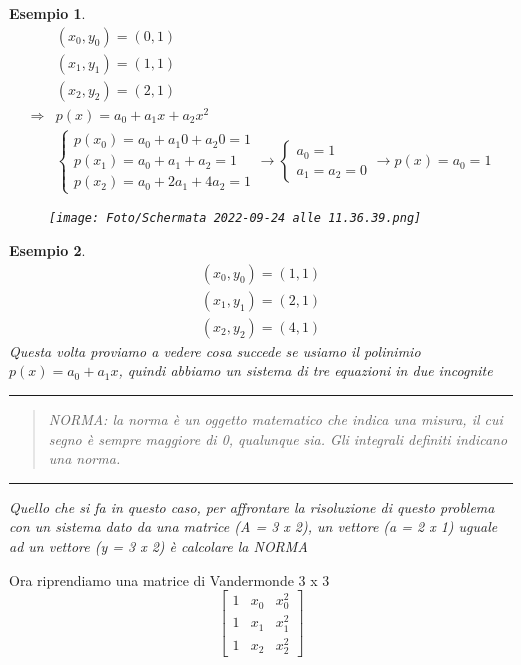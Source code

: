 \documentclass[a4paper, portrait]{book}
\numberwithin{equation}{chapter} %
\newtheorem{example}{Esempio}
\newcommand*\sepline{%
  \begin{center}
    \rule[1ex]{.5\textwidth}{.5pt}
  \end{center}}
\begin{document}
\begin{example}
    \begin{align}
        &(x_0,y_0) = (0,1)\\
        &(x_1,y_1) = (1,1)\\
        &(x_2,y_2) = (2,1)\\
        \Rightarrow &p(x) = a_0 + a_1 x + a_2 x^2\\
        &\begin{cases}
            p(x_0) = a_0 + a_1 0 + a_2 0 = 1\\
            p(x_1) = a_0 + a_1 + a_2 = 1\\
            p(x_2) = a_0 + 2 a_1 + 4 a_2 = 1
        \end{cases} \rightarrow \begin{cases}
            a_0 = 1\\
            a_1 = a_2 = 0
        \end{cases} \rightarrow p(x) = a_0 = 1
    \end{align}
    \begin{figure}[h!]
        \centering
        \texttt{[image: Foto/Schermata 2022-09-24 alle 11.36.39.png]}
        \caption{}
    \end{figure}
\end{example}
\newpage
\begin{example}
    \begin{align}
        (x_0,y_0) = (1,1)\\
        (x_1,y_1) = (2,1)\\
        (x_2,y_2) = (4,1)
    \end{align}
    Questa volta proviamo a vedere cosa succede se usiamo il polinimio $p(x) = a_0 + a_1 x$, quindi abbiamo un sistema di tre equazioni in due incognite
    \sepline{}
    \begin{quote}
        NORMA: la norma è un oggetto matematico che indica una misura, il cui segno è sempre  maggiore di 0, qualunque sia. Gli integrali definiti indicano una norma.\\
    \end{quote}
    \sepline{}
    Quello che si fa in questo caso, per affrontare la risoluzione di questo problema con un sistema dato da una matrice (A = 3 x 2), un vettore (a = 2 x 1) uguale ad un vettore (y = 3 x 2) è calcolare la NORMA\\
\end{example}
Ora riprendiamo una matrice di Vandermonde 3 x 3 
\begin{equation}
    \begin{bmatrix}
        1&x_0&x_0^2\\
        1&x_1&x_1^2\\
        1&x_2&x_2^2
    \end{bmatrix}
\end{equation}
\end{document}
